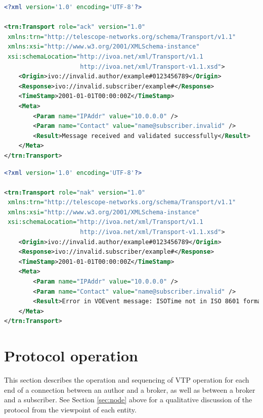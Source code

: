 \documentclass[a4paper,11pt]{ivoa}
\begin{document}
\begin{lstlisting}[language=XML,label=lst:ack,
                   caption=Sample VOEvent message receipt response indicating successful transmission (\xmlel{ack}).]
<?xml version='1.0' encoding='UTF-8'?>

<trn:Transport role="ack" version="1.0"
 xmlns:trn="http://telescope-networks.org/schema/Transport/v1.1"
 xmlns:xsi="http://www.w3.org/2001/XMLSchema-instance"
 xsi:schemaLocation="http://ivoa.net/xml/Transport/v1.1
                     http://ivoa.net/xml/Transport-v1.1.xsd">
    <Origin>ivo://invalid.author/example#0123456789</Origin>
    <Response>ivo://invalid.subscriber/example#</Response>
    <TimeStamp>2001-01-01T00:00:00Z</TimeStamp>
    <Meta>
        <Param name="IPAddr" value="10.0.0.0" />
        <Param name="Contact" value="name@subscriber.invalid" />
        <Result>Message received and validated successfully</Result>
    </Meta>
</trn:Transport>
\end{lstlisting}

\begin{lstlisting}[language=XML,label=lst:nak,
                   caption=Sample VOEvent message receipt response indicating unsuccessful transmission (\xmlel{nak}).]
<?xml version='1.0' encoding='UTF-8'?>

<trn:Transport role="nak" version="1.0"
 xmlns:trn="http://telescope-networks.org/schema/Transport/v1.1"
 xmlns:xsi="http://www.w3.org/2001/XMLSchema-instance"
 xsi:schemaLocation="http://ivoa.net/xml/Transport/v1.1
                     http://ivoa.net/xml/Transport-v1.1.xsd">
    <Origin>ivo://invalid.author/example#0123456789</Origin>
    <Response>ivo://invalid.subscriber/example#</Response>
    <TimeStamp>2001-01-01T00:00:00Z</TimeStamp>
    <Meta>
        <Param name="IPAddr" value="10.0.0.0" />
        <Param name="Contact" value="name@subscriber.invalid" />
        <Result>Error in VOEvent message: ISOTime not in ISO 8601 format</Result>
    </Meta>
</trn:Transport>
\end{lstlisting}

\section{Protocol operation}
\label{sec:protocol}

This section describes the operation and sequencing of VTP operation for each
end of a connection between an author and a broker, as well as between a
broker and a subscriber. See Section \ref{sec:node} above for a qualitative
discussion of the protocol from the viewpoint of each entity.
\end{document}

